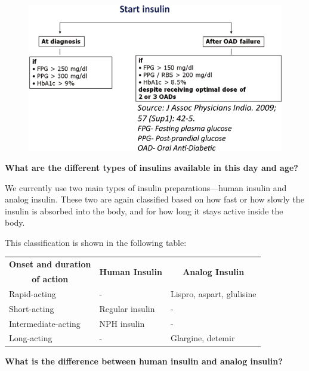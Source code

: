 \begin{figure}[h]
\centering
\includegraphics[scale=2.2]{images/088.jpg}
\end{figure}

\noindent\textbf{What are the different types of insulins available in this day and age?}

We currently use two main types of insulin preparations—human insulin and analog insulin. These two are again classified based on how fast or how slowly the insulin is absorbed into the body, and for how long it stays active inside the body.

This classification is shown in the following table:

{
\begin{center}
\small\addtolength{\tabcolsep}{-1pt}
\begin{tabular}{|l|l|l|}
\hline
\multicolumn{1}{|c|}{\textbf{Onset and duration}} & \multicolumn{1}{c|}{\multirow{2}{2.3cm}{\textbf{Human Insulin}}} & \multicolumn{1}{c|}{\multirow{2}{2.3cm}{\textbf{Analog Insulin}}}\\
\multicolumn{1}{|c|}{\textbf{of action}} &  & \\
\hline
Rapid-acting & \quad\qquad- & Lispro, aspart, glulisine\\
\hline
Short-acting & Regular insulin & \qquad\qquad-\\
\hline
Intermediate-acting & NPH insulin & \qquad\qquad-\\
\hline
Long-acting & \quad\qquad- & Glargine, detemir\\
\hline
\end{tabular}
\end{center}
}\relax

\noindent\textbf{What is the difference between human insulin and analog insulin?}

